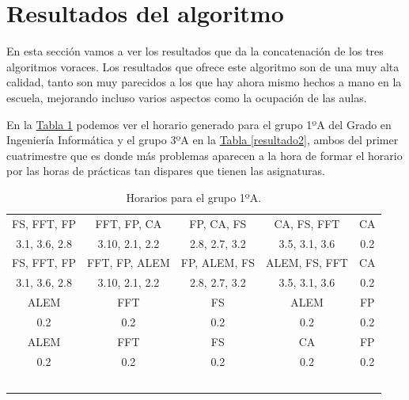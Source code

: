\section{Resultados del algoritmo}

En esta sección vamos a ver los resultados que da la concatenación de los tres algoritmos voraces. Los resultados que ofrece este algoritmo son de una muy alta calidad, tanto son muy parecidos a los que hay ahora mismo hechos a mano en la escuela, mejorando incluso varios aspectos como la ocupación de las aulas.

En la \hyperref[resultado1]{Tabla \ref*{resultado1}} podemos ver el horario generado para el grupo 1ºA del Grado en Ingeniería Informática y el grupo 3ºA en la \hyperref[resultado2]{Tabla \ref*{resultado2}}, ambos del primer cuatrimestre que es donde más problemas aparecen a la hora de formar el horario por las horas de prácticas tan dispares que tienen las asignaturas.

\begin{table}[H]
\begin{center}
\begin{tabular}{|c|c|c|c|c|}
\hline
FS, FFT, FP  & FFT, FP, CA  & FP, CA, FS  & CA, FS, FFT  & CA  \\
3.1, 3.6, 2.8 & 3.10, 2.1, 2.2 & 2.8, 2.7, 3.2 & 3.5, 3.1, 3.6 & 0.2 \\
\hline
FS, FFT, FP & FFT, FP, ALEM & FP, ALEM, FS & ALEM, FS, FFT & CA \\
3.1, 3.6, 2.8 & 3.10, 2.1, 2.2 & 2.8, 2.7, 3.2 & 3.5, 3.1, 3.6 & 0.2 \\
\hline
ALEM & FFT & FS & ALEM & FP \\
0.2 & 0.2 & 0.2 & 0.2 & 0.2 \\
\hline
ALEM & FFT & FS & CA & FP \\
0.2 & 0.2 & 0.2 & 0.2 & 0.2 \\
\hline
 & & & & \\
\hline
& & & & \\
\hline
& & & & \\
\hline
& & & & \\
\hline
& & & & \\
\hline
\end{tabular}
\end{center}
\caption{Horarios para el grupo 1ºA.}
\label{resultado1}
\end{table}

